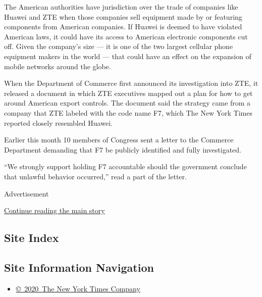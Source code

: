 The American authorities have jurisdiction over the trade of companies
like Huawei and ZTE when those companies sell equipment made by or
featuring components from American companies. If Huawei is deemed to
have violated American laws, it could have its access to American
electronic components cut off. Given the company's size --- it is one of
the two largest cellular phone equipment makers in the world --- that
could have an effect on the expansion of mobile networks around the
globe.

When the Department of Commerce first announced its investigation into
ZTE, it released a document in which ZTE executives mapped out a plan
for how to get around American export controls. The document said the
strategy came from a company that ZTE labeled with the code name F7,
which The New York Times reported closely resembled Huawei.

Earlier this month 10 members of Congress sent a letter to the Commerce
Department demanding that F7 be publicly identified and fully
investigated.

``We strongly support holding F7 accountable should the government
conclude that unlawful behavior occurred,'' read a part of the letter.

Advertisement

\protect\hyperlink{after-bottom}{Continue reading the main story}

\hypertarget{site-index}{%
\subsection{Site Index}\label{site-index}}

\hypertarget{site-information-navigation}{%
\subsection{Site Information
Navigation}\label{site-information-navigation}}

\begin{itemize}
\tightlist
\item
  \href{https://help.nytimes.com/hc/en-us/articles/115014792127-Copyright-notice}{©~2020~The
  New York Times Company}
\end{itemize}

